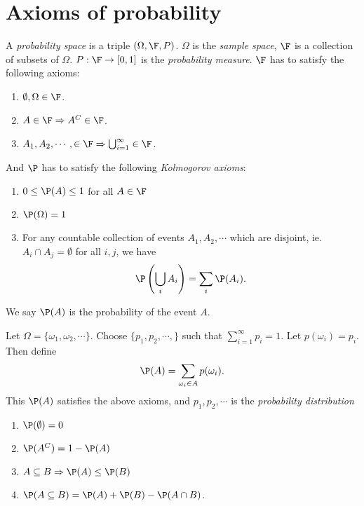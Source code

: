 \documentclass[a4paper]{article}
\begin{document}
\section{Axioms of probability}
\begin{defi}
  A \emph{probability space} is a triple $(\Omega, \F, P)$. $\Omega$ is the \emph{sample space}, $\F$ is a collection of subsets of $\Omega$. $P: \F\to [0, 1]$ is the \emph{probability measure}. $\F$ has to satisfy the following axioms:
  \begin{enumerate}
    \item $\emptyset, \Omega\in \F$.
    \item $A\in \F \Rightarrow  A^C\in \F$.
    \item $A_1, A_2, \cdots, \in \F \Rightarrow \bigcup_{i = 1}^\infty \in \F$.
  \end{enumerate}
  And $\P$ has to satisfy the following \emph{Kolmogorov axioms}:
  \begin{enumerate}
    \item $0 \leq \P(A) \leq 1 $ for all $A\in \F$
    \item $\P(\Omega) = 1$
    \item For any countable collection of events $A_1, A_2, \cdots$ which are disjoint, ie. $A_i\cap A_j = \emptyset$ for all $i, j$, we have
      \[
        \P\left(\bigcup_i A_i\right) = \sum_i \P(A_i).
      \]
  \end{enumerate}
  We say $\P(A)$ is the probability of the event $A$.
\end{defi}

\begin{defi}
  Let $\Omega = \{\omega_1, \omega_2, \cdots\}$. Choose $\{p_1, p_2, \cdots, \}$ such that $\sum_{i = 1}^\infty p_i= 1$. Let $p(\omega_i) = p_i$. Then define
  \[
    \P(A) = \sum_{\omega_i\in A} p(\omega_i).
  \]
  This $\P(A)$ satisfies the above axioms, and $p_1, p_2, \cdots$ is the \emph{probability distribution}
\end{defi}

\begin{thm}\leavevmode
  \begin{enumerate}
    \item $\P(\emptyset) = 0$
    \item $\P(A^C) = 1 - \P(A)$
    \item $A\subseteq B \Rightarrow \P(A) \leq \P(B)$
    \item $\P (A\subseteq B) = \P(A) + \P(B) - \P(A\cap B)$.
  \end{enumerate}
\end{thm}
\end{document}
